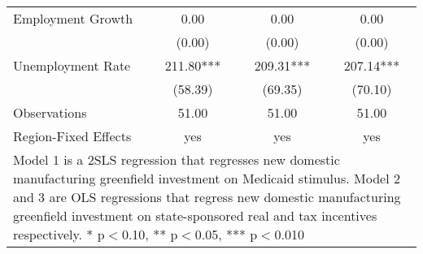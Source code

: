 \begin{table}[!htbp]
\begin{tabular}{l*{3}{c}}
Employment Growth   &        0.00   &        0.00   &        0.00   \\
                    &      (0.00)   &      (0.00)   &      (0.00)   \\
Unemployment Rate   &      211.80***&      209.31***&      207.14***\\
                    &     (58.39)   &     (69.35)   &     (70.10)   \\
\hline
Observations        &       51.00   &       51.00   &       51.00   \\
Region-Fixed Effects&         yes   &         yes   &         yes   \\
\hline\hline
\multicolumn{4}{p{0.75\linewidth}}{\footnotesize Model 1 is a 2SLS regression that regresses new domestic manufacturing greenfield investment on Medicaid stimulus. Model 2 and 3 are OLS regressions that regress new domestic manufacturing greenfield investment on state-sponsored real and tax incentives respectively. * p$<$0.10, ** p$<$0.05, *** p$<$0.010}\\
\end{tabular}
\end{table}
